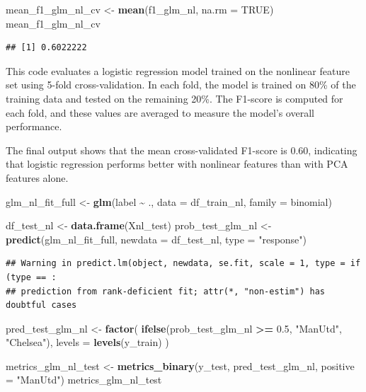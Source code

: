 \documentclass[
]{article}
\newenvironment{Shaded}{\begin{snugshade}}{\end{snugshade}}
\newcommand{\AttributeTok}[1]{\textcolor[rgb]{0.13,0.29,0.53}{#1}}
\newcommand{\ConstantTok}[1]{\textcolor[rgb]{0.56,0.35,0.01}{#1}}
\newcommand{\FloatTok}[1]{\textcolor[rgb]{0.00,0.00,0.81}{#1}}
\newcommand{\FunctionTok}[1]{\textcolor[rgb]{0.13,0.29,0.53}{\textbf{#1}}}
\newcommand{\NormalTok}[1]{#1}
\newcommand{\OtherTok}[1]{\textcolor[rgb]{0.56,0.35,0.01}{#1}}
\newcommand{\SpecialCharTok}[1]{\textcolor[rgb]{0.81,0.36,0.00}{\textbf{#1}}}
\newcommand{\StringTok}[1]{\textcolor[rgb]{0.31,0.60,0.02}{#1}}
\begin{document}
\begin{Shaded}
\begin{Highlighting}[]
\NormalTok{mean\_f1\_glm\_nl\_cv }\OtherTok{\textless{}{-}} \FunctionTok{mean}\NormalTok{(f1\_glm\_nl, }\AttributeTok{na.rm =} \ConstantTok{TRUE}\NormalTok{)}
\NormalTok{mean\_f1\_glm\_nl\_cv}
\end{Highlighting}
\end{Shaded}

\begin{verbatim}
## [1] 0.6022222
\end{verbatim}

This code evaluates a logistic regression model trained on the nonlinear
feature set using 5-fold cross-validation. In each fold, the model is
trained on 80\% of the training data and tested on the remaining 20\%.
The F1-score is computed for each fold, and these values are averaged to
measure the model's overall performance.

The final output shows that the mean cross-validated F1-score is 0.60,
indicating that logistic regression performs better with nonlinear
features than with PCA features alone.

\begin{Shaded}
\begin{Highlighting}[]
\NormalTok{glm\_nl\_fit\_full }\OtherTok{\textless{}{-}} \FunctionTok{glm}\NormalTok{(label }\SpecialCharTok{\textasciitilde{}}\NormalTok{ ., }\AttributeTok{data =}\NormalTok{ df\_train\_nl, }\AttributeTok{family =}\NormalTok{ binomial)}

\NormalTok{df\_test\_nl }\OtherTok{\textless{}{-}} \FunctionTok{data.frame}\NormalTok{(Xnl\_test)}
\NormalTok{prob\_test\_glm\_nl }\OtherTok{\textless{}{-}} \FunctionTok{predict}\NormalTok{(glm\_nl\_fit\_full, }\AttributeTok{newdata =}\NormalTok{ df\_test\_nl, }\AttributeTok{type =} \StringTok{"response"}\NormalTok{)}
\end{Highlighting}
\end{Shaded}

\begin{verbatim}
## Warning in predict.lm(object, newdata, se.fit, scale = 1, type = if (type == :
## prediction from rank-deficient fit; attr(*, "non-estim") has doubtful cases
\end{verbatim}

\begin{Shaded}
\begin{Highlighting}[]
\NormalTok{pred\_test\_glm\_nl }\OtherTok{\textless{}{-}} \FunctionTok{factor}\NormalTok{(}
  \FunctionTok{ifelse}\NormalTok{(prob\_test\_glm\_nl }\SpecialCharTok{\textgreater{}=} \FloatTok{0.5}\NormalTok{, }\StringTok{"ManUtd"}\NormalTok{, }\StringTok{"Chelsea"}\NormalTok{),}
  \AttributeTok{levels =} \FunctionTok{levels}\NormalTok{(y\_train)}
\NormalTok{)}

\NormalTok{metrics\_glm\_nl\_test }\OtherTok{\textless{}{-}} \FunctionTok{metrics\_binary}\NormalTok{(y\_test, pred\_test\_glm\_nl, }\AttributeTok{positive =} \StringTok{"ManUtd"}\NormalTok{)}
\NormalTok{metrics\_glm\_nl\_test}
\end{Highlighting}
\end{Shaded}
\end{document}
